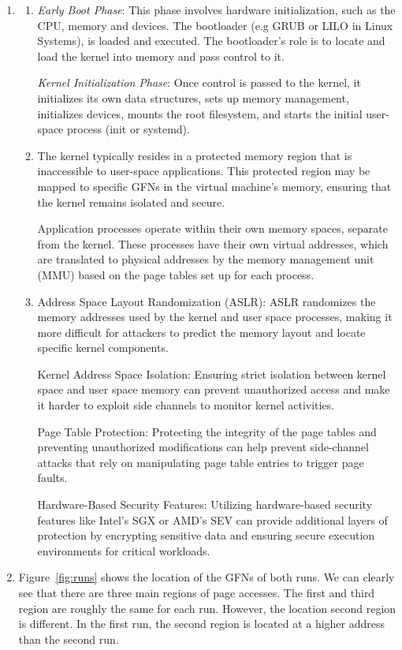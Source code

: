 \documentclass[sheet=1, english]{dexercise}
\begin{document}
\begin{enumerate}
    \item
        \begin{enumerate}
          \item
            \emph{Early Boot Phase}: This phase involves hardware initialization, such
            as the CPU, memory and devices. The bootloader (e.g GRUB or LILO in
            Linux Systems), is loaded and executed. The bootloader's role is to
            locate and load the kernel into memory and pass control to it.

            \emph{Kernel Initialization Phase}: Once control is passed to the kernel,
            it initializes its own data structures, sets up memory management,
            initializes devices, mounts the root filesystem, and starts the
            initial user-space process (init or systemd).

          \item
            The kernel typically resides in a protected memory region that is
            inaccessible to user-space applications. This protected region may
            be mapped to specific GFNs in the virtual machine's memory, ensuring
            that the kernel remains isolated and secure.

            Application processes operate within their own memory spaces,
            separate from the kernel. These processes have their own virtual
            addresses, which are translated to physical addresses by the memory
            management unit (MMU) based on the page tables set up for each
            process.

            \item Address Space Layout Randomization (ASLR): ASLR randomizes the memory addresses used by the kernel and user space processes, making it more difficult for attackers to predict the memory layout and locate specific kernel components.

            Kernel Address Space Isolation: Ensuring strict isolation between kernel space and user space memory can prevent unauthorized access and make it harder to exploit side channels to monitor kernel activities.

            Page Table Protection: Protecting the integrity of the page tables and preventing unauthorized modifications can help prevent side-channel attacks that rely on manipulating page table entries to trigger page faults.

 Hardware-Based Security Features: Utilizing hardware-based security features like Intel's SGX or AMD's SEV can provide additional layers of protection by encrypting sensitive data and ensuring secure execution environments for critical workloads.
        \end{enumerate}
    \item
    Figure~\ref{fig:runs} shows the location of the GFNs of both runs.
    We can clearly see that there are three main regions of page accesses.
    The first and third region are roughly the same for each run.
    However, the location second region is different.
    In the first run, the second region is located at a higher address than the second run.


\end{enumerate}
\end{document}
